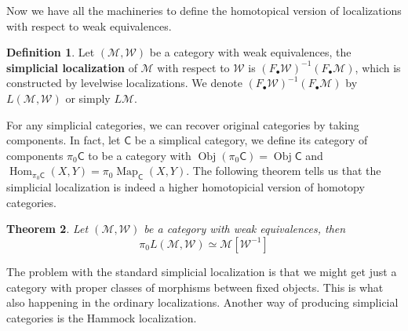 \documentclass[11pt]{amsart}
\numberwithin{equation}{section}
\newtheorem{thm}{Theorem}[section]
\theoremstyle{definition}
\newtheorem{defn}[thm]{Definition}
\theoremstyle{remark}
\numberwithin{equation}{section}
\newcommand{\CM}{{\mathcal M}}
\newcommand{\CC}{{\mathsf C}}
\newcommand{\CW}{{\mathcal{W}}}
\newcommand{\cm}{{\mathcal{M}}}
\newcommand{\ob}{\operatorname{Obj}}
\newcommand{\Hom}{\operatorname{Hom}}
\newcommand{\map}{\operatorname{Map}}
\begin{document}
Now we have all the machineries to define the homotopical version of localizations with respect to weak equivalences.

\begin{defn}
	Let $(\cm, \CW)$ be a category with weak equivalences, the {\bf simplicial localization} of $\cm$ with respect to $\CW$ is $(F_{\bullet}\CW)^{-1}(F_{\bullet}\CM)$, which is constructed by levelwise localizations. We denote $(F_{\bullet}\CW)^{-1}(F_{\bullet}\CM)$ by $L(\cm, \CW)$ or simply $L\cm$.
\end{defn}

For any simplicial categories, we can recover original categories by taking components. In fact, let $\CC$ be a simplical category, we define its category of components $\pi_0\CC$ to be a category with $\ob(\pi_0 \CC)=\ob \CC$ and $\Hom_{\pi_0 \CC}(X,Y)=\pi_0 \map_{\CC}(X,Y)$. The following theorem tells us that the simplicial localization is indeed a higher homotopicial version of homotopy categories.
\begin{thm}
	Let $(\cm, \CW)$ be a category with weak equivalences, then
	\begin{equation*}
	\pi_0 L(\cm, \CW) \simeq  \cm[\CW^{-1}]
	\end{equation*}
\end{thm}

The problem with the standard simplicial localization is that we might get just a category with proper classes of morphisms between fixed objects. This is what also happening in the ordinary localizations. Another way of producing simplicial categories is the Hammock localization.
\end{document}

